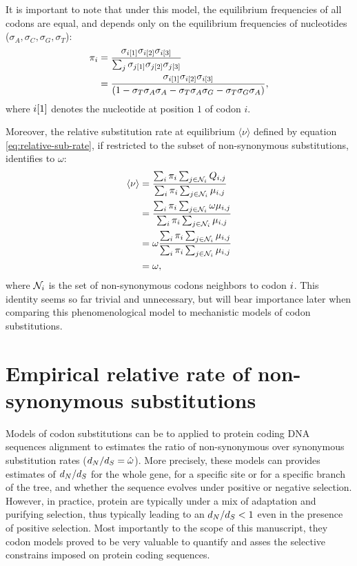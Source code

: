 It is important to note that under this model, the equilibrium frequencies of all codons are equal, and depends only on the equilibrium frequencies of nucleotides ($\sigma_{A}, \sigma_{C}, \sigma_{G}, \sigma_{T}$):
\begin{align}
\pi_{{i}} & = \dfrac{\sigma_{{i}[1]}\sigma_{{i}[2]}\sigma_{{i}[3]}}{\sum_{{j}}\sigma_{{j}[1]}\sigma_{{j}[2]}\sigma_{{j}[3]} } \\
 & = \dfrac{\sigma_{{i}[1]}\sigma_{{i}[2]}\sigma_{{i}[3]}}{(1 - \sigma_{T}\sigma_{A}\sigma_{A} - \sigma_{T}\sigma_{A}\sigma_{G} - \sigma_{T}\sigma_{G}\sigma_{A} )},
\end{align}
where ${i}[1]$ denotes the nucleotide at position $1$ of codon $i$.

Moreover, the relative substitution rate at equilibrium $\langle \nu \rangle$ defined by equation \ref{eq:relative-sub-rate}, if restricted to the subset of non-synonymous substitutions, identifies to $\omega$:
\begin{align}
\langle \nu \rangle & = \dfrac{ \sum_{{i}} \pi_{{i}} \sum_{{j} \in \mathcal{N}_{{i}}} Q_{{i}, {j}}}{\sum_{{i}} \pi_{{i}}  \sum_{{j} \in \mathcal{N}_{{i}}} \mu_{{i}, {j}}} \\
					& = \dfrac{ \sum_{{i}} \pi_{{i}} \sum_{{j} \in \mathcal{N}_{{i}}} \omega \mu_{{i}, {j}}}{\sum_{{i}} \pi_{{i}}  \sum_{{j} \in \mathcal{N}_{{i}}} \mu_{{i}, {j}}} \\
					& = \omega \dfrac{ \sum_{{i}} \pi_{{i}} \sum_{{j} \in \mathcal{N}_{{i}}} \mu_{{i}, {j}}}{\sum_{{i}} \pi_{{i}}  \sum_{{j} \in \mathcal{N}_{{i}}} \mu_{{i}, {j}}} \\
					& = \omega, 
\end{align}
where $\mathcal{N}_{{i}}$ is the set of non-synonymous codons neighbors to codon ${i}$.
This identity seems so far trivial and unnecessary, but will bear importance later when comparing this phenomenological model to mechanistic models of codon substitutions.


\section{Empirical relative rate of non-synonymous substitutions}
Models of codon substitutions can be to applied to protein coding DNA sequences alignment to estimates the ratio of non-synonymous over synonymous substitution rates ($d_N / d_S=\hat{\omega}$).
More precisely, these models can provides estimates of $d_N / d_S$ for the whole gene, for a specific site or for a specific branch of the tree, and whether the sequence evolves under positive or negative selection.
However, in practice, protein are typically under a mix of adaptation and purifying selection, thus typically leading to an $d_N / d_S<1$ even in the presence of positive selection.
Most importantly to the scope of this manuscript, they codon models proved to be very valuable to quantify and asses the selective constrains imposed on protein coding sequences.

